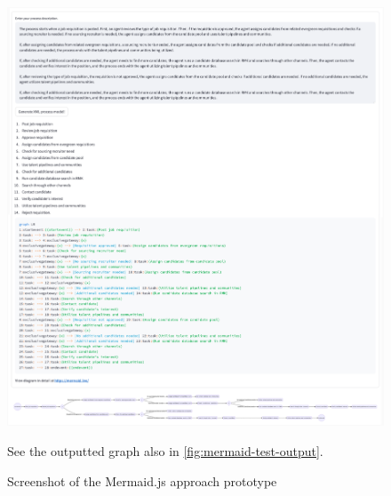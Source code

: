 \begin{figure}[h]
    \centering
    \includegraphics[width=\textwidth,height=\textheight,keepaspectratio]{../assets/images/Mermaid prototype.png}
    \caption{Screenshot of the Mermaid.js approach prototype}
    \label{fig:mermaid-prototype}

    \medskip
    \small
    See the outputted graph also  in \autoref{fig:mermaid-test-output}.
\end{figure}

